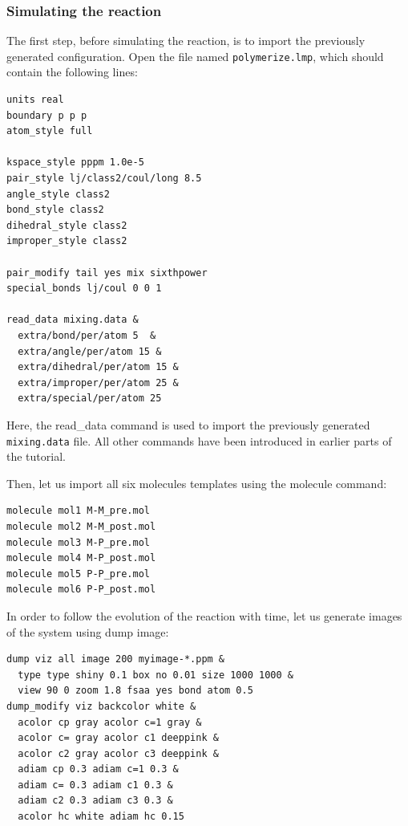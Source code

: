 \documentclass[9pt,tutorial]{livecoms}
\newcommand{\lmpcmd}[1]{\hspace{0pt}\colorbox{listing}{\textcolor{command}{\small{#1}}}\hspace{0pt}} %
\newcommand{\flecmd}[1]{\textcolor{command}{\texttt{#1}}} %
\begin{document}
\subsubsection{Simulating the reaction}

The first step, before simulating the reaction, is to import the previously
generated configuration.  Open the file named \flecmd{polymerize.lmp},
which should contain the following lines:
\begin{lstlisting}
units real
boundary p p p
atom_style full

kspace_style pppm 1.0e-5
pair_style lj/class2/coul/long 8.5
angle_style class2
bond_style class2
dihedral_style class2
improper_style class2

pair_modify tail yes mix sixthpower
special_bonds lj/coul 0 0 1

read_data mixing.data &
  extra/bond/per/atom 5  &
  extra/angle/per/atom 15 &
  extra/dihedral/per/atom 15 &
  extra/improper/per/atom 25 &
  extra/special/per/atom 25
\end{lstlisting}
Here, the \lmpcmd{read\_data} command is used to import the
previously generated \flecmd{mixing.data} file.  All other commands
have been introduced in earlier parts of the tutorial.

Then, let us import all six molecules templates using the \lmpcmd{molecule} command:
\begin{lstlisting}
molecule mol1 M-M_pre.mol
molecule mol2 M-M_post.mol
molecule mol3 M-P_pre.mol
molecule mol4 M-P_post.mol
molecule mol5 P-P_pre.mol
molecule mol6 P-P_post.mol
\end{lstlisting}
In order to follow the evolution of the reaction with time, let us generate images
of the system using \lmpcmd{dump image}:
\begin{lstlisting}
dump viz all image 200 myimage-*.ppm &
  type type shiny 0.1 box no 0.01 size 1000 1000 &
  view 90 0 zoom 1.8 fsaa yes bond atom 0.5
dump_modify viz backcolor white &
  acolor cp gray acolor c=1 gray &
  acolor c= gray acolor c1 deeppink &
  acolor c2 gray acolor c3 deeppink &
  adiam cp 0.3 adiam c=1 0.3 &
  adiam c= 0.3 adiam c1 0.3 &
  adiam c2 0.3 adiam c3 0.3 &
  acolor hc white adiam hc 0.15
\end{lstlisting}
\end{document}
